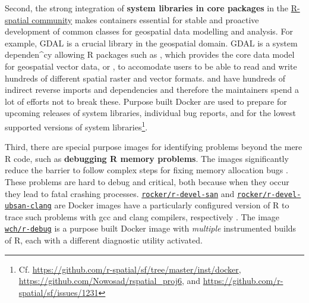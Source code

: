Second, the strong integration of \textbf{system libraries in core
packages} in the \href{https://www.r-spatial.org/}{R-spatial community}
makes containers essential for stable and proactive development of
common classes for geospatial data modelling and analysis. For example,
GDAL \citep{gdal_2019} is a crucial library in the geospatial domain.
GDAL is a system dependen\^{}cy allowing R packages such as
, which provides the core data model for geospatial vector
data, or , to accomodate users to be able to read and
write hundreds of different spatial raster and vector formats.
 and  have hundreds of indirect reverse
imports and dependencies and therefore the maintainers spend a lot of
efforts not to break these. Purpose built Docker are used to prepare for
upcoming releases of system libraries, individual bug reports, and for
the lowest supported versions of system
libraries\footnote{Cf. \href{https://github.com/r-spatial/sf/tree/master/inst/docker}{https://github.com/r-spatial/sf/tree/master/inst/docker}, \href{https://github.com/Nowosad/rspatial_proj6}{https://github.com/Nowosad/rspatial\_proj6}, and \href{https://github.com/r-spatial/sf/issues/1231}{https://github.com/r-spatial/sf/issues/1231}}.

Third, there are special purpose images for identifying problems beyond
the mere R code, such as \textbf{debugging R memory problems}. The
images significantly reduce the barrier to follow complex steps for
fixing memory allocation bugs
\citep[cf. Section~4.3 in][]{core_writing_1999}. These problems are hard
to debug and critical, both because when they occur they lead to fatal
crashing processes.
\href{https://github.com/rocker-org/r-devel-san}{\texttt{rocker/r-devel-san}}
and
\href{https://github.com/rocker-org/r-devel-san-clang}{\texttt{rocker/r-devel-ubsan-clang}}
are Docker images have a particularly configured version of R to trace
such problems with gcc and clang compilers, respectively
\citep[cf.~ for examples,][]{eddelbuettel_sanitizers_2014}.
The image \href{https://github.com/wch/r-debug}{\texttt{wch/r-debug}} is
a purpose built Docker image with \emph{multiple} instrumented builds of
R, each with a different diagnostic utility activated.

